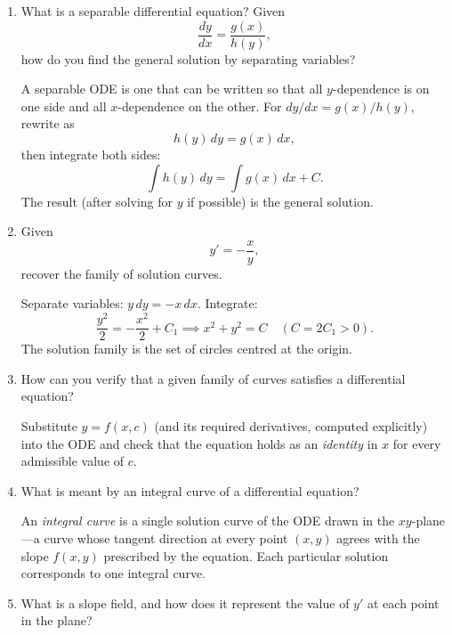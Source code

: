 \documentclass{self-check}
\begin{document}
\begin{enumerate}[leftmargin=*, itemsep=8pt]
    \begin{answer}
      For a well-behaved ODE, the general solution of an \(n\)th-order equation contains exactly \(n\) arbitrary constants. This reflects the \(n\)-fold integration needed to reduce the equation to \(y\), each step contributing one constant.
    \end{answer}
  \item What is a separable differential equation? Given
    \[ \frac{dy}{dx}=\frac{g(x)}{h(y)}, \]
    how do you find the general solution by separating variables?

    \begin{answer}
      A separable ODE is one that can be written so that all \(y\)-dependence is on one side and all \(x\)-dependence on the other. For \(dy/dx=g(x)/h(y)\), rewrite as
      \[ h(y)\,dy = g(x)\,dx, \]
      then integrate both sides:
      \[ \int h(y)\,dy = \int g(x)\,dx + C. \]
      The result (after solving for \(y\) if possible) is the general solution.
    \end{answer}
  \item Given
    \[ y'=-\frac{x}{y}, \]
    recover the family of solution curves.

    \begin{answer}
      Separate variables: \(y\,dy = -x\,dx\). Integrate:
      \[ \frac{y^{2}}{2}= -\frac{x^{2}}{2}+ C_{1} \implies x^{2}+y^{2} = C \quad (C=2C_{1}>0). \]
      The solution family is the set of circles centred at the origin.
    \end{answer}
  \item How can you verify that a given family of curves satisfies a differential equation?

    \begin{answer}
      Substitute \(y=f(x,c)\) (and its required derivatives, computed explicitly) into the ODE and check that the equation holds as an \emph{identity} in \(x\) for every admissible value of \(c\).
    \end{answer}
  \item What is meant by an integral curve of a differential equation?

    \begin{answer}
      An \emph{integral curve} is a single solution curve of the ODE drawn in the \(xy\)-plane---a curve whose tangent direction at every point \((x,y)\) agrees with the slope \(f(x,y)\) prescribed by the equation. Each particular solution corresponds to one integral curve.
    \end{answer}
  \item What is a slope field, and how does it represent the value of \(y'\) at each point in the plane?


\end{enumerate}
\end{document}
